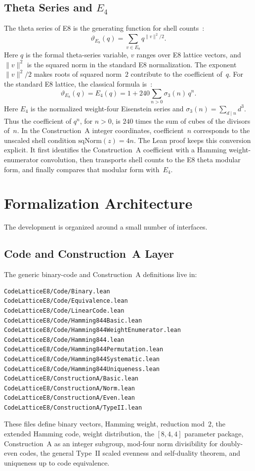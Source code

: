 \documentclass[12pt]{article}
\theoremstyle{definition}
\newcommand{\Theta}{\vartheta}
\begin{document}
\subsection{Theta Series and $E_4$}

The theta series of E8 is the generating function for shell
counts~\cite{ConwaySloane1999}:
\[
  \Theta_{E_8}(q) = \sum_{v \in E_8} q^{\|v\|^2/2}.
\]
Here \(q\) is the formal theta-series variable, \(v\) ranges over E8 lattice
vectors, and \(\|v\|^2\) is the squared norm in the standard E8 normalization.
The exponent \(\|v\|^2/2\) makes roots of squared norm~\(2\) contribute to the
coefficient of~\(q\).
For the standard E8 lattice, the classical formula is~\cite{ConwaySloane1999}:
\[
  \Theta_{E_8}(q) = E_4(q) = 1 + 240\sum_{n>0}\sigma_3(n)\,q^n.
\]
Here \(E_4\) is the normalized weight-four Eisenstein series and
\(\sigma_3(n)=\sum_{d\mid n} d^3\).  Thus the coefficient of \(q^n\), for
\(n>0\), is \(240\) times the sum of cubes of the divisors of~\(n\).
In the Construction~A integer coordinates, coefficient~$n$ corresponds to the
unscaled shell condition $\mathrm{sqNorm}(z) = 4n$.  The Lean proof keeps this
conversion explicit.  It first identifies the Construction~A coefficient with a
Hamming weight-enumerator convolution, then transports shell counts to the E8
theta modular form, and finally compares that modular form with~$E_4$.

\section{Formalization Architecture}
\label{sec:architecture}

The development is organized around a small number of interfaces.

\subsection{Code and Construction~A Layer}

The generic binary-code and Construction~A definitions live in:
\begin{lstlisting}[style=lean]
CodeLatticeE8/Code/Binary.lean
CodeLatticeE8/Code/Equivalence.lean
CodeLatticeE8/Code/LinearCode.lean
CodeLatticeE8/Code/Hamming844Basic.lean
CodeLatticeE8/Code/Hamming844WeightEnumerator.lean
CodeLatticeE8/Code/Hamming844.lean
CodeLatticeE8/Code/Hamming844Permutation.lean
CodeLatticeE8/Code/Hamming844Systematic.lean
CodeLatticeE8/Code/Hamming844Uniqueness.lean
CodeLatticeE8/ConstructionA/Basic.lean
CodeLatticeE8/ConstructionA/Norm.lean
CodeLatticeE8/ConstructionA/Even.lean
CodeLatticeE8/ConstructionA/TypeII.lean
\end{lstlisting}
These files define binary vectors, Hamming weight, reduction mod~$2$, the
extended Hamming code, weight distribution, the $[8,4,4]$ parameter package,
Construction~A as an integer subgroup, mod-four norm divisibility for
doubly-even codes, the general Type~II scaled evenness and self-duality theorem,
and uniqueness up to code equivalence.
\end{document}
